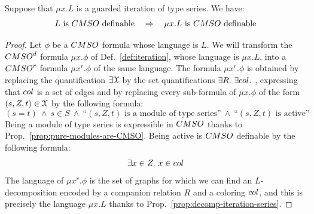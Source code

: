 \begin{theorem} 
Suppose that $\mu x. L$ is a guarded iteration of type series. We have: 
$$ L\text{ is $\CMSO$ definable} \quad \Rightarrow \quad  \mu x.L \text{ is  $\CMSO$ definable}$$
\end{theorem}
\begin{proof} Let $\phi$ be a $\CMSO$ formula whose language is $L$.
We will transform the $\CMSOd$ formula $\mu x. \phi$ of Def.~\ref{def:iteration}, whose language is $\mu x. L$, into a $\CMSO^r$ formula  $\mu x^r. \phi$ of the same language.  The formula $\mu x^r. \phi$ is obtained by replacing the quantification $\exists \mathcal X$ by the set quantifications $\exists R.\ \exists \col.\ $, expressing that $\col$ is a set of edges and by replacing every sub-formula of $\mu x. \phi$ of the form $(s,Z,t)\in \mathcal X$ by the following formula: 
$$(s=t) \ \wedge\ s\in S \ \wedge\ \text{``$(s,Z,t)$ is a module of type series''} \ \wedge\  \text{``$(s,Z,t)$ is active''}$$
Being a module of type series is expressible in $\CMSO$ thanks to Prop.~\ref{prop:pure-modules-are-CMSO}. Being active is  $\CMSO$ definable by the following formula:
$$ \exists x\in Z.\  x\in\col$$
The language of $\mu x^r. \phi$ is the set of graphs for which we can find an $L$-decomposition encoded by a companion relation $R$ and a coloring $\col$, and this is precisely the language $\mu x. L$ thanks to Prop.~\ref{prop:decomp-iteration-series}.
\end{proof}